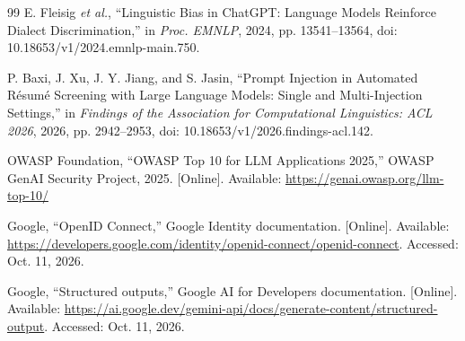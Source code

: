 \documentclass[conference]{IEEEtran}
\begin{document}
\begin{thebibliography}{99}
E. Fleisig \emph{et al.}, ``Linguistic Bias in ChatGPT: Language Models Reinforce Dialect Discrimination,'' in \emph{Proc. EMNLP}, 2024, pp. 13541--13564, doi: 10.18653/v1/2024.emnlp-main.750.

P. Baxi, J. Xu, J. Y. Jiang, and S. Jasin,
``Prompt Injection in Automated R\'{e}sum\'{e} Screening with Large Language Models: Single and Multi-Injection Settings,''
in \emph{Findings of the Association for Computational Linguistics: ACL 2026}, 2026, pp. 2942--2953, doi: 10.18653/v1/2026.findings-acl.142.

OWASP Foundation,
``OWASP Top 10 for LLM Applications 2025,''
OWASP GenAI Security Project, 2025. [Online]. Available: \url{https://genai.owasp.org/llm-top-10/}

Google,
``OpenID Connect,''
Google Identity documentation. [Online]. Available: \url{https://developers.google.com/identity/openid-connect/openid-connect}. Accessed: Oct. 11, 2026.

Google,
``Structured outputs,''
Google AI for Developers documentation. [Online]. Available:
\url{https://ai.google.dev/gemini-api/docs/generate-content/structured-output}.
Accessed: Oct. 11, 2026.

\end{thebibliography}
\end{document}

